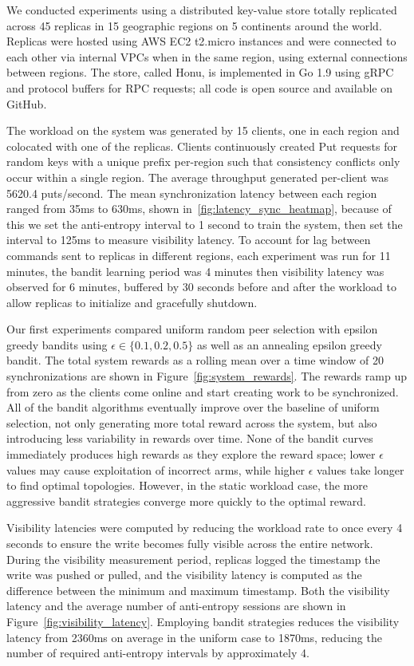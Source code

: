 We conducted experiments using a distributed key-value store totally
replicated across 45 replicas in 15 geographic regions on 5 continents
around the world.
Replicas were hosted using AWS EC2 t2.micro instances and were connected to
each other via internal VPCs when in the same region, using external
connections between regions.
The store, called Honu, is implemented in Go 1.9 using gRPC and protocol
buffers for RPC requests; all code is open source and available on GitHub.

The workload on the system was generated by 15 clients, one in each region and
colocated with one of the replicas.
Clients continuously created Put requests for random keys with a unique
prefix per-region such that consistency conflicts only occur within a
single region.
The average throughput generated per-client was 5620.4 puts/second.
The mean synchronization latency between each region ranged from 35ms to
630ms, shown in~\ref{fig:latency_sync_heatmap}, because of this we set the
anti-entropy interval to 1 second to train the system, then set the interval
to 125ms to measure visibility latency.
To account for lag between commands sent to replicas in different regions,
each experiment was run for 11 minutes, the bandit learning period was 4
minutes then visibility latency was observed for 6 minutes, buffered by 30
seconds before and after the workload to allow replicas to initialize and
gracefully shutdown.

Our first experiments compared uniform random peer selection with epsilon
greedy bandits using $\epsilon \in \{0.1, 0.2, 0.5\}$ as well as an annealing
epsilon greedy bandit.
The total system rewards as a rolling mean over a time window of 20
synchronizations are shown in Figure~\ref{fig:system_rewards}.
The rewards ramp up from zero as the clients come online and start
creating work to be synchronized.
All of the bandit algorithms eventually improve over the baseline of uniform
selection, not only generating more total reward across the system, but also
introducing less variability in rewards over time.
None of the bandit curves immediately produces high rewards as they explore
the reward space; lower $\epsilon$ values may cause exploitation of incorrect
arms, while higher $\epsilon$ values take longer to find optimal topologies.
However, in the static workload case, the more aggressive bandit strategies
converge more quickly to the optimal reward.

Visibility latencies were computed by reducing the workload rate to once
every 4 seconds to ensure the write becomes fully visible across the entire
network.
During the visibility measurement period, replicas logged the timestamp the
write was pushed or pulled, and the visibility latency is computed as the
difference between the minimum and maximum timestamp.
Both the visibility latency and the average number of anti-entropy sessions
are shown in Figure~\ref{fig:visibility_latency}.
Employing bandit strategies reduces the visibility latency from 2360ms on
average in the uniform case to 1870ms, reducing the number of required
anti-entropy intervals by approximately 4.

